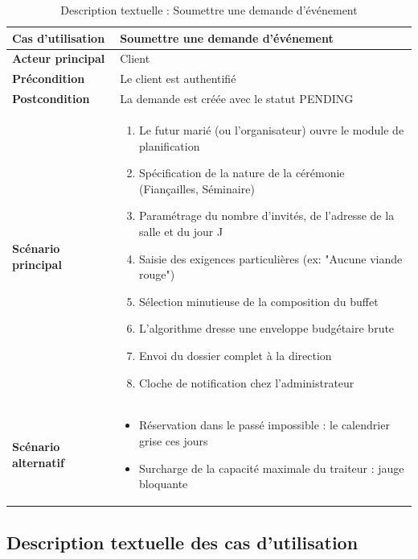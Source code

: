 \begin{table}[H]
    \centering
    \caption{Description textuelle : Soumettre une demande d'événement}
    \label{tab:desc_demande_event}
    \renewcommand{\arraystretch}{1.3}
    \begin{tabular}{|p{4cm}|p{8.5cm}|}
        \hline
        \textbf{Cas d'utilisation} & Soumettre une demande d'événement \\
        \hline
        \textbf{Acteur principal} & Client \\
        \hline
        \textbf{Précondition} & Le client est authentifié \\
        \hline
        \textbf{Postcondition} & La demande est créée avec le statut PENDING \\
        \hline
        \textbf{Scénario principal} &
        \begin{enumerate}
            \item Le futur marié (ou l'organisateur) ouvre le module de planification
            \item Spécification de la nature de la cérémonie (Fiançailles, Séminaire)
            \item Paramétrage du nombre d'invités, de l'adresse de la salle et du jour J
            \item Saisie des exigences particulières (ex: "Aucune viande rouge")
            \item Sélection minutieuse de la composition du buffet
            \item L'algorithme dresse une enveloppe budgétaire brute
            \item Envoi du dossier complet à la direction
            \item Cloche de notification chez l'administrateur
        \end{enumerate} \\
        \hline
        \textbf{Scénario alternatif} &
        \begin{itemize}
            \item[3a.] Réservation dans le passé impossible : le calendrier grise ces jours
            \item[3b.] Surcharge de la capacité maximale du traiteur : jauge bloquante
        \end{itemize} \\
        \hline
    \end{tabular}
\end{table}

\subsection{Description textuelle des cas d'utilisation}

